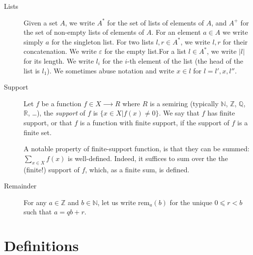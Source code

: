 \documentclass{article}
\newcommand{\lists}[1]{{#1}^*}
\newcommand{\nelists}[1]{{#1}^+}
\newcommand{\emptylist}{ε}
\newcommand{\pos}[2]{{#2}_{#1}}
\newcommand{\length}[1]{|#1|}
\newcommand{\rem}[2]{\mathrm{rem}_{#1}(#2)}
\begin{document}
\begin{description}
\item[Lists] Given a set $A$, we write $\lists{A}$ for the set of lists of
  elements of $A$, and $\nelists{A}$ for the set of non-empty lists of elements
  of $A$. For an element $a∈A$ we write simply $a$ for the singleton list. For
  two lists $l,r∈\lists{A}$, we write $l,r$ for their concatenation. We write
  $\emptylist$ for the empty list.For a list $l∈\lists{A}$, we write
  $\length{l}$ for its length. We write $\pos{i}{l}$ for the $i$-th element of
  the list (the head of the list is $\pos{1}{l}$). We sometimes abuse notation
  and write $x∈l$ for $l = l',x,l''$.
\item[Support] Let $f$ be a function $f∈X⟶R$ where $R$ is a semiring
  (typically $ℕ$, $ℤ$, $ℚ$, $ℝ$, …), the \emph{support} of $f$ is
  $\{ x∈X | f(x)≠0 \}$. We say that $f$ has finite support, or that
  $f$ is a function with finite support, if the support of $f$ is
  a finite set.

  A notable property of finite-support function, is that they can be
  summed: $∑_{x∈X}f(x)$ is well-defined. Indeed, it suffices to sum
  over the the (finite!) support of $f$, which, as a finite sum, is
  defined.
\item[Remainder] For any $a∈ℤ$ and $b∈ℕ$, let us write $\rem{a}{b}$
  for the unique $0⩽r<b$ such that $a=qb+r$.
\end{description}

\section{Definitions}
\label{sec:definitions}

\end{document}
